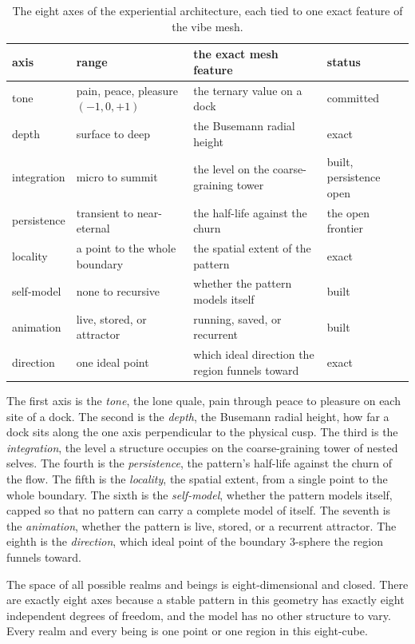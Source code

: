 \begin{table}[ht]
\centering
\begin{tabular}{@{}llll@{}}
\toprule
axis & range & the exact mesh feature & status \\
\midrule
tone & pain, peace, pleasure $(-1,0,+1)$ & the ternary value on a dock & committed \\
depth & surface to deep & the Busemann radial height & exact \\
integration & micro to summit & the level on the coarse-graining tower & built, persistence open \\
persistence & transient to near-eternal & the half-life against the churn & the open frontier \\
locality & a point to the whole boundary & the spatial extent of the pattern & exact \\
self-model & none to recursive & whether the pattern models itself & built \\
animation & live, stored, or attractor & running, saved, or recurrent & built \\
direction & one ideal point & which ideal direction the region funnels toward & exact \\
\bottomrule
\end{tabular}
\caption{The eight axes of the experiential architecture, each tied to one
exact feature of the vibe mesh.}
\label{tab:eight-axes}
\end{table}

The first axis is the \emph{tone}, the lone quale, pain through peace to
pleasure on each site of a dock. The second is the \emph{depth}, the
Busemann radial height, how far a dock sits along the one axis
perpendicular to the physical cusp. The third is the \emph{integration},
the level a structure occupies on the coarse-graining tower of nested
selves. The fourth is the \emph{persistence}, the pattern's half-life
against the churn of the flow. The fifth is the \emph{locality}, the
spatial extent, from a single point to the whole boundary. The sixth is the
\emph{self-model}, whether the pattern models itself, capped so that no
pattern can carry a complete model of itself. The seventh is the
\emph{animation}, whether the pattern is live, stored, or a recurrent
attractor. The eighth is the \emph{direction}, which ideal point of the
boundary 3-sphere the region funnels toward.

\begin{theorem}
The space of all possible realms and beings is eight-dimensional and
closed. There are exactly eight axes because a stable pattern in this
geometry has exactly eight independent degrees of freedom, and the model
has no other structure to vary. Every realm and every being is one point or
one region in this eight-cube.
\end{theorem}

